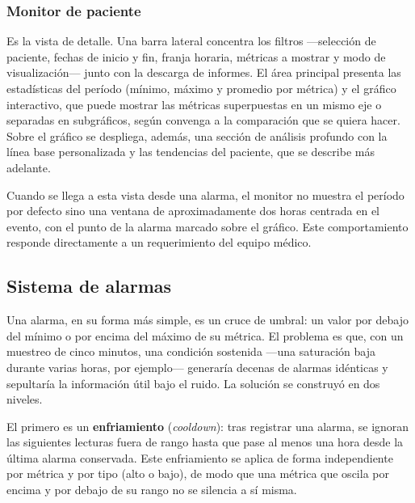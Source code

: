 \documentclass[12pt,a4paper]{article}
\begin{document}

    \subsubsection{Monitor de paciente}
    Es la vista de detalle. Una barra lateral concentra los filtros —selección de paciente, fechas de inicio y fin, franja horaria, métricas a mostrar y modo de visualización— junto con la descarga de informes. El área principal presenta las estadísticas del período (mínimo, máximo y promedio por métrica) y el gráfico interactivo, que puede mostrar las métricas superpuestas en un mismo eje o separadas en subgráficos, según convenga a la comparación que se quiera hacer. Sobre el gráfico se despliega, además, una sección de análisis profundo con la línea base personalizada y las tendencias del paciente, que se describe más adelante.

    Cuando se llega a esta vista desde una alarma, el monitor no muestra el período por defecto sino una ventana de aproximadamente dos horas centrada en el evento, con el punto de la alarma marcado sobre el gráfico. Este comportamiento responde directamente a un requerimiento del equipo médico.


    \subsection{Sistema de alarmas}
    Una alarma, en su forma más simple, es un cruce de umbral: un valor por debajo del mínimo o por encima del máximo de su métrica. El problema es que, con un muestreo de cinco minutos, una condición sostenida —una saturación baja durante varias horas, por ejemplo— generaría decenas de alarmas idénticas y sepultaría la información útil bajo el ruido. La solución se construyó en dos niveles.

    El primero es un \textbf{enfriamiento} (\textit{cooldown}): tras registrar una alarma, se ignoran las siguientes lecturas fuera de rango hasta que pase al menos una hora desde la última alarma conservada. Este enfriamiento se aplica de forma independiente por métrica y por tipo (alto o bajo), de modo que una métrica que oscila por encima y por debajo de su rango no se silencia a sí misma.
\end{document}
